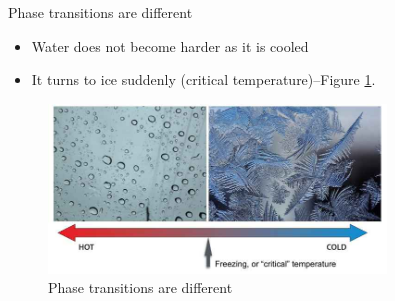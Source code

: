 \documentclass[]{article}
\begin{document}
 Phase transitions are different
\begin{itemize}
	\item Water does not become harder as it is cooled
	\item It turns to ice suddenly (critical temperature)--Figure \ref{fig:water-ice}.
\end{itemize}

\begin{figure}[H]
	\begin{center}
		\caption{Phase transitions are different}\label{fig:water-ice}
		\includegraphics[width=0.8\textwidth]{water-ice}
	\end{center}
\end{figure}
\end{document}

